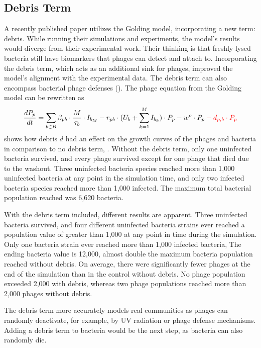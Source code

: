 \subsection{Debris Term}
\label{sec:discussion:debris}
A recently published paper \citet{deyEmergentHigherorderInteractions2025} utilizes the Golding model, incorporating a new term: debris. While running their simulations and experiments, the model's results would diverge from their experimental work. 
Their thinking is that freshly lysed bacteria still have biomarkers that phages can detect and attach to. 
Incorporating the debris term, which acts as an additional sink for phages, improved the model's alignment with the experimental data.
The debris term can also encompass bacterial phage defenses (). 
The phage equation from the Golding model can be rewritten as 
\[
 \frac{dP_p}{dt} = \sum_{b\in B}\beta_{p b}\cdot\frac{M}{\tau_b} \cdot I_{b_M} - r_{p b}\cdot(U_b + \sum_{k=1}^{M} I_{b_k})\cdot P_p - w^o \cdot P_p \mathcolor{red}{- d_{p, b} \cdot P_p}
\]
 shows how debris $d$ had an effect on the growth curves of the phages and bacteria in comparison to no debris term, . 
Without the debris term, only one uninfected bacteria survived, and every phage survived except for one phage that died due to the washout. 
Three uninfected bacteria species reached more than 1,000 uninfected bacteria at any point in the simulation time, and only two infected bacteria species reached more than 1,000 infected. 
The maximum total bacterial population reached was 6,620 bacteria. 

With the debris term included, different results are apparent. 
Three uninfected bacteria survived, and four different uninfected bacteria strains ever reached a population value of greater than 1,000 at any point in time during the simulation. 
Only one bacteria strain ever reached more than 1,000 infected bacteria, 
The ending bacteria value is 12,000, almost double the maximum bacteria population reached without debris. 
On average, there were significantly fewer phages at the end of the simulation than in the control without debris. 
No phage population exceeded 2,000 with debris, whereas two phage populations reached more than 2,000 phages without debris. 

The debris term more accurately models real communities as phages can randomly deactivate, for example, by UV radiation or phage defense mechanisms. 
Adding a debris term to bacteria would be the next step, as bacteria can also randomly die. 

